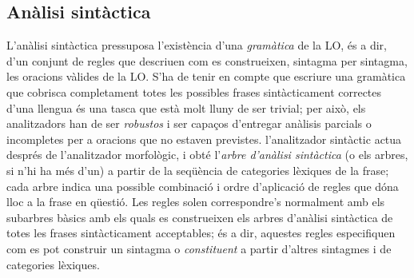 \subsection{Anàlisi sintàctica}
\label{s3:ansyn}
L'anàlisi sintàctica pressuposa l'existència d'una \emph{gramàtica} de
la LO, és a dir, d'un conjunt de regles que descriuen com es
construeixen, sintagma per sintagma, les oracions vàlides de la
LO. S'ha de tenir en compte que escriure una gramàtica que cobrisca
completament totes les possibles frases sintàcticament correctes d'una
llengua és una tasca que està molt lluny de ser trivial; per això, els
analitzadors han de ser \emph{robustos} i ser capaços d'entregar
anàlisis parcials o incompletes per a oracions que no estaven
previstes. l'analitzador sintàctic actua després de l'analitzador
morfològic, i obté l'\emph{arbre d'anàlisi sintàctica} (o els arbres,
si n'hi ha més d'un) a partir de la seqüència de categories lèxiques
de la frase; cada arbre indica una possible combinació i ordre
d'aplicació de regles que dóna lloc a la frase en qüestió. Les regles
solen correspondre's normalment amb els subarbres bàsics amb els quals
es construeixen els arbres d'anàlisi sintàctica de totes les frases
sintàcticament acceptables; és a dir, aquestes regles especifiquen com
es pot construir un sintagma o {\em constituent} a partir d'altres
sintagmes i de categories lèxiques.

